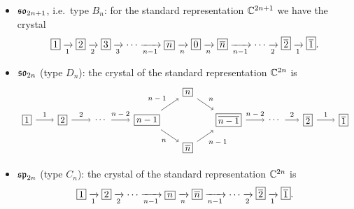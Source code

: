 \begin{example}\leavevmode
\begin{itemize}
  \item $\mathfrak{so}_{2n+1}$, i.e.\ type $B_n$: for the standard representation
    $\mathbb{C}^{2n+1}$ we have the crystal
    \[
      \bx{1} \xto{1} \bx{2} \xto{2} \bx{3} \xto{3} \cdots \xto{n-1} \bx{n}
      \xto{n} \bx{0} \xto{n} \bx{\overline{n}} \xto{n-1} \cdots \xto{2}
      \bx{\overline{2}} \xto{1} \bx{\overline{1}}.
    \]
  \item $\mathfrak{so}_{2n}$ (type $D_n$): the crystal of the standard representation
    $\mathbb{C}^{2n}$ is
    \[
    \begin{tikzpicture}[baseline=-3pt,x=0.92cm,every node/.append style={font=\small},
        ar/.style={->,shorten >=1pt,shorten <=1pt},
        lab/.style={font=\scriptsize}]
      \node (1) at (0,0) {\bx{1}};
      \node (2) at (1.4,0) {\bx{2}};
      \node (d1) at (2.9,0) {$\cdots$};
      \node (m) at (4.7,0) {\bx{n-1}};
      \node (n) at (6.3,1.0) {\bx{n}};
      \node (nb) at (6.3,-1.0) {\bx{\overline{n}}};
      \node (mb) at (7.9,0) {\bx{\overline{n-1}}};
      \node (d2) at (9.7,0) {$\cdots$};
      \node (2b) at (11.0,0) {\bx{\overline{2}}};
      \node (1b) at (12.4,0) {\bx{\overline{1}}};
      \draw[ar] (1) -- node[lab,above]{$1$} (2);
      \draw[ar] (2) -- node[lab,above]{$2$} (d1);
      \draw[ar] (d1) -- node[lab,above]{$n-2$} (m);
      \draw[ar] (m) -- node[lab,above left]{$n-1$} (n);
      \draw[ar] (m) -- node[lab,below left]{$n$} (nb);
      \draw[ar] (n) -- node[lab,above right]{$n$} (mb);
      \draw[ar] (nb) -- node[lab,below right]{$n-1$} (mb);
      \draw[ar] (mb) -- node[lab,above]{$n-2$} (d2);
      \draw[ar] (d2) -- node[lab,above]{$2$} (2b);
      \draw[ar] (2b) -- node[lab,above]{$1$} (1b);
    \end{tikzpicture}
    \]
  \item $\mathfrak{sp}_{2n}$ (type $C_n$): the crystal of the standard representation
    $\mathbb{C}^{2n}$ is
    \[
      \bx{1} \xto{1} \bx{2} \xto{2} \cdots \xto{n-1} \bx{n} \xto{n}
      \bx{\overline{n}} \xto{n-1} \cdots \xto{2} \bx{\overline{2}} \xto{1}
      \bx{\overline{1}}.
    \]
\end{itemize}
\end{example}

